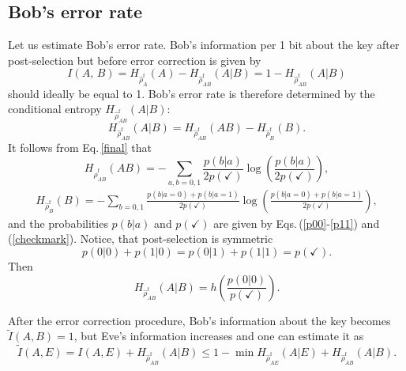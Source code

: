 \documentclass[a4paper]{article}
\begin{document}
\subsection{Bob's error rate}
Let us estimate Bob's error rate.
Bob's information per 1 bit about the key after post-selection but before error correction is given by
%
\begin{equation}
    I(A,\,B) = H_{\hat{\rho}^{\text{f}}_{A}}(A)-H_{\hat{\rho}^{\text{f}}_{AB}}(A|B) = 1 - H_{\hat{\rho}^{\text{f}}_{AB}}(A|B)
\end{equation}
%
should ideally be equal to 1.
Bob's error rate is therefore determined by the conditional entropy $H_{\hat{\rho}^{\text{f}}_{AB}}(A|B)$:
%
\begin{equation}
     H_{\hat{\rho}^{\text{f}}_{AB}}(A | B) = H_{\hat{\rho}^{\text{f}}_{AB}}(AB) - H_{\hat{\rho}^{\text{f}}_{B}}(B).
\end{equation}
It follows from Eq.\,\eqref{final} that 
\begin{equation}
    H_{\hat{\rho}^{\text{f}}_{AB}}(AB) = -\sum\limits_{a, b = 0, 1}\frac{p(b | a)}{2 p(\checkmark)}\log\left(\frac{p(b | a)}{2 p(\checkmark)}\right),
\end{equation}
\begin{equation}
\begin{split}
    H_{\hat{\rho}^{\text{f}}_{B}}(B) = -\sum\limits_{b = 0, 1}\frac{p(b | a = 0) + p(b | a = 1)}{2 p(\checkmark)}\log\left(\frac{p(b | a = 0) + p(b | a = 1)}{2 p(\checkmark)}\right),
\end{split}
\end{equation}
and the probabilities $p(b|a)$ and $p(\checkmark)$ are given by Eqs.\,(\ref{p00}-\ref{p11}) and (\ref{checkmark}). Notice, that post-selection is symmetric
\begin{equation}
    p(0 | 0) + p(1 | 0) = p(0 | 1) + p(1 | 1) = p(\checkmark).
\end{equation}
Then
\begin{equation}
    H_{\hat{\rho}^{\text{f}}_{AB}}(A|B) =  h\left(\frac{p(0 | 0)}{p(\checkmark)}\right).
    \label{I_AB}
\end{equation}

After the error correction procedure, Bob's information about the key becomes $\tilde I(A,B)=1$, but Eve's information increases and one can estimate it as 
\begin{equation}
    \tilde I(A,E) = I(A,E)+H_{\hat{\rho}^{\text{f}}_{AB}}(A|B) \leq 1-\min H_{\hat{\rho}^\text{f}_{AE}}(A | E) + H_{\hat{\rho}^{\text{f}}_{AB}}(A|B).
\end{equation}
\end{document}
